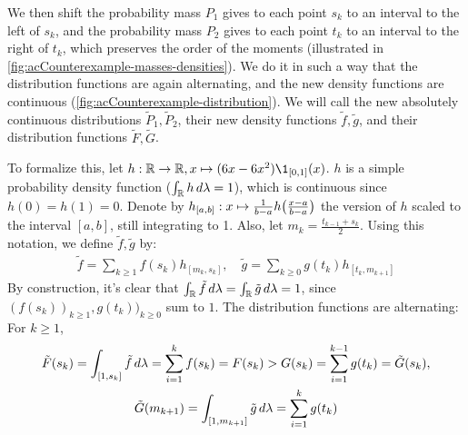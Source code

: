 \documentclass[a4paper]{scrreprt}
\begin{document}
\begin{ex}
\begin{enumerate}
            We then shift the probability mass $P_1$ gives to each point $s_k$ to an interval to the left of $s_k$, and the probability mass $P_2$ gives to each point $t_k$ to an interval to the right of $t_k$, which preserves the order of the moments (illustrated in \autoref{fig:acCounterexample-masses-densities}). We do it in such a way that the distribution functions are again alternating, and the new density functions are continuous (\autoref{fig:acCounterexample-distribution}). We will call the new absolutely continuous distributions $\tilde{P}_1, \tilde{P}_2$, their new density functions $\tilde{f}, \tilde{g}$, and their distribution functions $\tilde{F}, \tilde{G}$.
            
            To formalize this, let $h: \R \to \R, x \mapsto (6x - 6x^2)\1_{[0, 1]}(x)$. $h$ is a simple probability density function ($\int_{\mathbb{R}} h \, d\lambda = 1$), which is continuous since $h(0) = h(1) = 0$.
            Denote by $h_{[a, b]}: x \mapsto \frac{1}{b-a}h\bigl(\frac{x-a}{b-a}\bigr)$ the version of $h$ scaled to the interval $[a, b]$, still integrating to 1.
            Also, let $m_{k} = \frac{t_{k-1} + s_k}{2}$.
            Using this notation, we define $\tilde{f}, \tilde{g}$ by:
            \begin{gather}
                \tilde{f} = \sum_{k \geq 1}  f(s_k) h_{[m_k, s_k]}, \quad
                \tilde{g} = \sum_{k \geq 0}  g(t_k) h_{[t_k, m_{k+1}]}
                \label{eq:acSufficientTailOrderConditionCounterexample-densitiesDefinition}
            \end{gather}
            By construction, it's clear that $\int_{\mathbb{R}} \tilde{f} \, d\lambda = \int_{\mathbb{R}} \tilde{g} \, d\lambda = 1$, since $(f(s_k))_{k \geq 1}, g(t_k))_{k \geq 0}$ sum to $1$. The distribution functions are alternating:
            For $k \geq 1$,
            \begin{gather*}
                \tilde{F}(s_k) 
                = \lintegral{[1, s_k]}{\tilde{f}}{\lambda} 
                = \sum_{i=1}^{k} f(s_k) 
                = F(s_k)
                > G(s_k)
                = \sum_{i=1}^{k-1} g(t_k) 
                = \tilde{G}(s_k)
                ,\\                
                \tilde{G}(m_{k+1})                
                = \lintegral{[1, m_{k+1}]}{\tilde{g}}{\lambda} 
                = \sum_{i=1}^{k} g(t_k)

\end{gather*}
\end{enumerate}
\end{ex}
\end{document}
